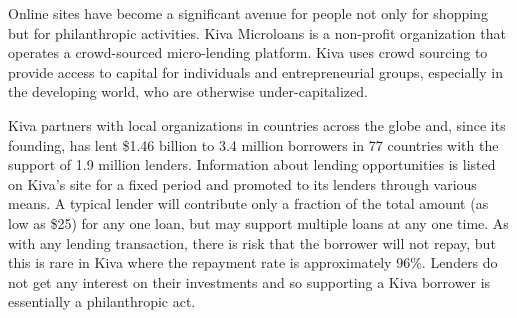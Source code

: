     
    
    
    Online sites have become a significant avenue for people not only for shopping but for philanthropic activities. Kiva Microloans is a non-profit organization that operates a crowd-sourced micro-lending platform. Kiva uses crowd sourcing to provide access to capital for individuals and entrepreneurial groups, especially in the developing world, who are otherwise under-capitalized.
    
    Kiva partners with local organizations in countries across the globe and, since its founding, has lent \$1.46 billion to 3.4 million borrowers in 77 countries with the support of 1.9 million lenders. Information about lending opportunities is listed on Kiva's site for a fixed period and promoted to its lenders through various means. A typical lender will contribute only a fraction of the total amount (as low as \$25) for any one loan, but may support multiple loans at any one time. As with any lending transaction, there is risk that the borrower will not repay, but this is rare in Kiva where the repayment rate is approximately 96\%. Lenders do not get any interest on their investments and so supporting a Kiva borrower is essentially a philanthropic act.

